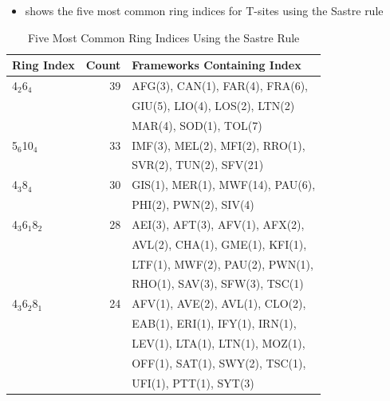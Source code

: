 \documentclass[11pt]{article}
\begin{document}
\begin{itemize}
\item {} shows the five most common ring indices for T-sites using the Sastre rule
\end{itemize}
\begin{table}[htbp]
\caption{Five Most Common Ring Indices Using the Sastre Rule \label{tab:sastre-ts}}
\centering
\begin{tabular}{lrl}
Ring Index & Count & Frameworks Containing Index\\
\hline
4\(_{\text{2}}\)\textbullet{}6\(_{\text{4}}\) & 39 & AFG(3), CAN(1), FAR(4), FRA(6),\\
 &  & GIU(5), LIO(4), LOS(2), LTN(2)\\
 &  & MAR(4), SOD(1), TOL(7)\\
5\(_{\text{6}}\)\textbullet{}10\(_{\text{4}}\) & 33 & IMF(3), MEL(2), MFI(2), RRO(1),\\
 &  & SVR(2), TUN(2), SFV(21)\\
4\(_{\text{3}}\)\textbullet{}8\(_{\text{4}}\) & 30 & GIS(1), MER(1), MWF(14), PAU(6),\\
 &  & PHI(2), PWN(2), SIV(4)\\
4\(_{\text{3}}\)\textbullet{}6\(_{\text{1}}\)\textbullet{}8\(_{\text{2}}\) & 28 & AEI(3), AFT(3), AFV(1), AFX(2),\\
 &  & AVL(2), CHA(1), GME(1), KFI(1),\\
 &  & LTF(1), MWF(2), PAU(2), PWN(1),\\
 &  & RHO(1), SAV(3), SFW(3), TSC(1)\\
4\(_{\text{3}}\)\textbullet{}6\(_{\text{2}}\)\textbullet{}8\(_{\text{1}}\) & 24 & AFV(1), AVE(2), AVL(1), CLO(2),\\
 &  & EAB(1), ERI(1), IFY(1), IRN(1),\\
 &  & LEV(1), LTA(1), LTN(1), MOZ(1),\\
 &  & OFF(1), SAT(1), SWY(2), TSC(1),\\
 &  & UFI(1), PTT(1), SYT(3)\\
\end{tabular}
\end{table}
\end{document}
